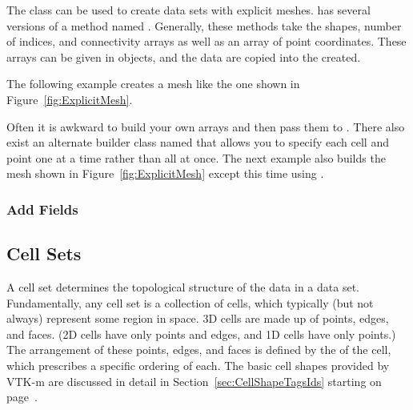 The  class can be used to create data sets
with explicit meshes.  has several
versions of a method named . Generally, these methods take
the shapes, number of indices, and connectivity arrays as well as an array
of point coordinates. These arrays can be given in 
objects, and the data are copied into the  created.

The following example creates a mesh like the one shown in
Figure~\ref{fig:ExplicitMesh}.


Often it is awkward to build your own arrays and then pass them to
. There also exist an alternate
builder class named  that allows
you to specify each cell and point one at a time rather than all at once.
The next example also builds the mesh shown in
Figure~\ref{fig:ExplicitMesh} except this time using
.


\subsubsection{Add Fields}



\subsection{Cell Sets}
\label{sec:DataSets:CellSets}


A cell set determines the topological structure of the data in a data set.
Fundamentally, any cell set is a collection of cells, which typically (but
not always) represent some region in space. 3D cells are made up of points,
edges, and faces. (2D cells have only points and edges, and 1D cells have
only points.) The arrangement of these points, edges, and faces is defined
by the 
of the cell, which prescribes a specific ordering of each. The basic cell
shapes provided by VTK-m are discussed in detail in
Section~\ref{sec:CellShapeTagsIds} starting on
page~\pageref{sec:CellShapeTagsIds}.

